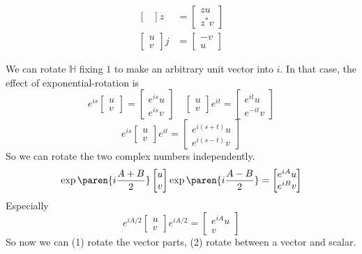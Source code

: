 \documentclass[draft]{scrartcl}
\newcommand{\ham}{\mathbb H}
\begin{document}
\begin{multicols*}{2}
\begin{minipage}{.5\linewidth}
\begin{align*}
\begin{bmatrix}
    \end{bmatrix} z &=
                      \begin{bmatrix}
                        zu \\  z^*v
                      \end{bmatrix} \\
    \begin{bmatrix}
      u \\ v
    \end{bmatrix} j &=
                      \begin{bmatrix}
                        -v \\ u
                      \end{bmatrix}
  \end{align*}
\end{minipage}
We can rotate \(\ham\) fixing \(1\) to make an arbitrary unit vector into \(i\). In that case, the effect of exponential-rotation is
\[
  e^{is}
  \begin{bmatrix}
    u \\ v
  \end{bmatrix}
  =
  \begin{bmatrix}
    e^{is} u \\ e^{is} v
  \end{bmatrix}
  \quad
  \begin{bmatrix}
    u \\v
  \end{bmatrix}
  e^{it} =
  \begin{bmatrix}
    e^{it} u \\ e^{-it} v
  \end{bmatrix}
\]
\[
  e^{is}
  \begin{bmatrix}
    u \\ v
  \end{bmatrix}
  e^{it}
  =
  \begin{bmatrix}
    e^{i(s+t)} u \\ e^{i(s-t)} v
  \end{bmatrix}
\]
So we can rotate the two complex numbers independently.
\[
  \exp\paren{i\frac{A+ B}2}
  \begin{bmatrix}
    u \\ v
  \end{bmatrix}
  \exp \paren{i\frac{A-B}2}
  =
  \begin{bmatrix}
    e^{iA} u \\ e^{iB}v
  \end{bmatrix}
\]
Especially
\[
  e^{iA/2}
  \begin{bmatrix}
    u \\v
  \end{bmatrix}
  e^{iA/2}
  =
  \begin{bmatrix}
    e^{iA} u \\ v
  \end{bmatrix}
\]
So now we can (1) rotate the vector parts, (2) rotate between a vector and scalar.


\end{multicols*}
\end{document}
